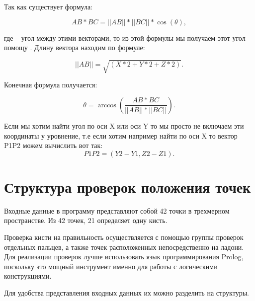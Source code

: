\hspace{0.6cm} Так как существует формула:

\begin{equation} 
\displaystyle  AB * BC = ||AB|| * ||BC|| * \cos(\theta),
\end{equation}

\hspace{0.6cm} где \theta – угол между этими векторами, то из этой формулы мы получаем этот угол помощу \arccos. Длину вектора находим по формуле:

\begin{equation} 
\displaystyle  ||AB|| = \sqrt{(X*2 + Y*2 + Z*2)}.
\end{equation}

\hspace{0.6cm} Конечная формула получается:

\begin{equation} 
\displaystyle  \theta = \arccos(\frac{AB * BC}{||AB|| * ||BC||}).
\end{equation}

\hspace{0.6cm} Если мы хотим найти угол по оси X или оси Y то мы просто не включаем эти координаты у уровнение, т.е если хотим например найти по оси X то вектор P1P2 можем вычислить вот так:
\begin{equation} 
\displaystyle  P1P2 = (Y2 - Y1, Z2 - Z1).
\end{equation} 
	

\section{Структура проверок положения точек}
\hspace{0.6cm} Входные данные в программу представляют собой 42 точки в трехмерном пространстве. Из 42 точек, 21 определяет одну кисть.

\hspace{0.6cm} Проверка кисти на правильность осуществляется с помощью группы проверок отдельных пальцев, а также точек расположенных непосредственно на ладони. Для реализации проверок лучше использовать язык программирования Prolog, поскольку это мощный инструмент именно для работы с логическими конструкциями.

\hspace{0.6cm} Для удобства представления входных данных их можно разделить на структуры. 


